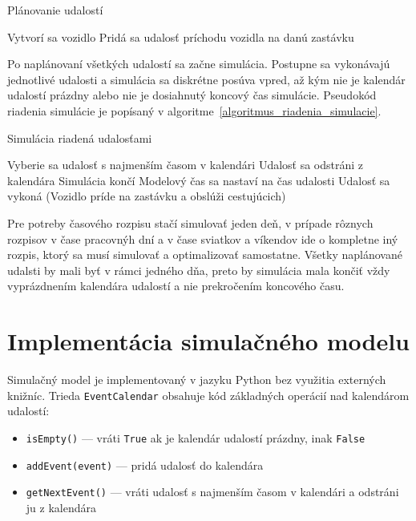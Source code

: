 \vspace*{\dimexpr0.5\baselineskip\relax}
\begin{algorithm}[H]\label{algoritmus_planovanie_udalosti}
  \caption{Plánovanie udalostí}
     {
      Vytvorí sa vozidlo\;
       {
        Pridá sa udalosť príchodu vozidla na danú zastávku\;
      }
    }
\end{algorithm}
\vspace*{\dimexpr0.5\baselineskip\relax}

Po naplánovaní všetkých udalostí sa začne simulácia.
Postupne sa vykonávajú jednotlivé udalosti a simulácia sa diskrétne posúva vpred, až kým nie je kalendár udalostí prázdny alebo nie je dosiahnutý koncový čas simulácie.
Pseudokód riadenia simulácie je popísaný v algoritme~\ref{algoritmus_riadenia_simulacie}.

\vspace*{\dimexpr0.5\baselineskip\relax}
\begin{algorithm}[H]\label{algoritmus_riadenia_simulacie}
\caption{Simulácia riadená udalosťami}
   {
    Vyberie sa udalosť s najmenším časom v kalendári\;
    Udalosť sa odstráni z kalendára\;
     {
      Simulácia končí\;
    }
    Modelový čas sa nastaví na čas udalosti\;
    Udalosť sa vykoná (Vozidlo príde na zastávku a obslúži cestujúcich)\;
  }
\end{algorithm}
\vspace*{\dimexpr0.5\baselineskip\relax}

Pre potreby časového rozpisu stačí simulovať jeden deň, v prípade rôznych rozpisov v čase pracovnýh dní a v čase sviatkov a víkendov ide o kompletne iný rozpis, ktorý sa musí simulovať a optimalizovať samostatne.
Všetky naplánované udalsti by mali byť v rámci jedného dňa, preto by simulácia mala končiť vždy vyprázdnením kalendára udalostí a nie prekročením koncového času.

\section{Implementácia simulačného modelu}

Simulačný model je implementovaný v jazyku Python bez využitia externých knižníc.
Trieda \texttt{EventCalendar} obsahuje kód základných operácií nad kalendárom udalostí:
\begin{itemize}
  \item \texttt{isEmpty()} --- vráti \texttt{True} ak je kalendár udalostí prázdny, inak \texttt{False}
  \item \texttt{addEvent(event)} --- pridá udalosť do kalendára
  \item \texttt{getNextEvent()} --- vráti udalosť s najmenším časom v kalendári a odstráni ju z kalendára
\end{itemize}

